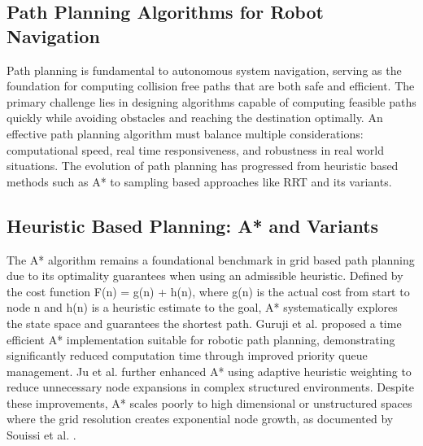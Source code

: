 \documentclass[a4paper,12pt,one side]{report}
\theoremstyle{definition}
\begin{document}
\begin{itemize}
\section{Path Planning Algorithms for Robot Navigation}
Path planning is fundamental to autonomous system navigation, serving as the foundation for computing collision free paths that are both safe and efficient. The primary challenge lies in designing algorithms capable of computing feasible paths quickly while avoiding obstacles and reaching the destination optimally. An effective path planning algorithm must balance multiple considerations: computational speed, real time responsiveness, and robustness in real world situations. The evolution of path planning has progressed from heuristic based methods such as A* to sampling based approaches like RRT and its variants.
\subsection{Heuristic Based Planning: A* and Variants}
The A* algorithm  remains a foundational benchmark in grid based path planning due to its optimality guarantees when using an admissible heuristic. Defined by the cost function F(n) = g(n) + h(n), where g(n) is the actual cost from start to node n and h(n) is a heuristic estimate to the goal, A* systematically explores the state space and guarantees the shortest path. Guruji et al. \cite{guruji2016time} proposed a time efficient A* implementation suitable for robotic path planning, demonstrating significantly reduced computation time through improved priority queue management. Ju et al. \cite{ju2020path} further enhanced A* using adaptive heuristic weighting to reduce unnecessary node expansions in complex structured environments. Despite these improvements, A* scales poorly to high dimensional or unstructured spaces where the grid resolution creates exponential node growth, as documented by Souissi et al. \cite{souissi2013path}.

\end{itemize}
\end{document}

